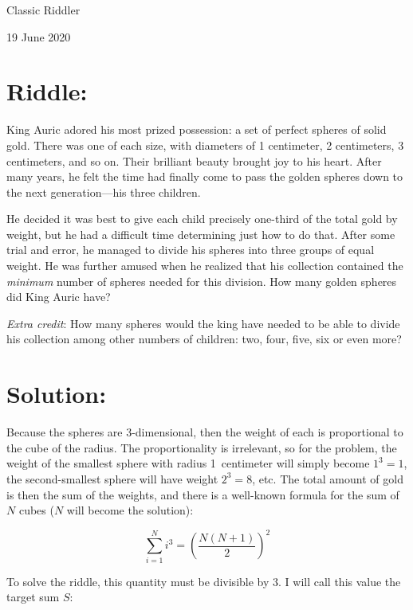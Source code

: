 \documentclass{article}
\begin{document}
\pagestyle{empty} %

\begin{center}
{\LARGE Classic Riddler}

\vspace{0.15in}

{\Large 19 June 2020}
\end{center}


\section*{Riddle:}

King Auric adored his most prized possession: a set of perfect spheres of solid gold.
There was one of each size, with diameters of 1 centimeter, 2 centimeters, 3 centimeters, and so on.
Their brilliant beauty brought joy to his heart.
After many years, he felt the time had finally come to pass the golden spheres down to the next generation---his three children.

He decided it was best to give each child precisely one-third of the total gold by weight, but he had a difficult time determining just how to do that.
After some trial and error, he managed to divide his spheres into three groups of equal weight.
He was further amused when he realized that his collection contained the \textit{minimum} number of spheres needed for this division.
How many golden spheres did King Auric have?

\textit{Extra credit}: How many spheres would the king have needed to be able to divide his collection among other numbers of children: two, four, five, six or even more?

\section*{Solution:}

Because the spheres are 3-dimensional, then the weight of each is proportional to the cube of the radius.
The proportionality is irrelevant, so for the problem, the weight of the smallest sphere with radius 1~centimeter will simply become $1^{3}=1$, the second-smallest sphere will have weight $2^{3}=8$, etc.
The total amount of gold is then the sum of the weights, and there is a well-known formula for the sum of $N$ cubes ($N$ will become the solution):

\[
\sum_{i=1}^{N}i^{3}=\left(\frac{N(N+1)}{2}\right)^{2}
\]

To solve the riddle, this quantity must be divisible by 3.
I will call this value the target sum $S$:
\end{document}
